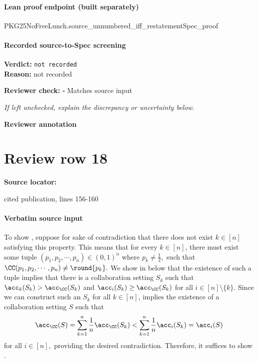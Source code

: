 \documentclass[10pt]{article}
\newcommand{\reviewerbox}{%
  \par\noindent\fbox{\parbox{0.96\linewidth}{\rule{0pt}{0.38in}}}\par
}
\newcommand{\reviewmatch}[1]{%
  \par\noindent\textbf{Reviewer check:} $\square$\; #1\par
  \noindent\emph{If left unchecked, explain the discrepancy or uncertainty below.}\par
}
\begin{document}
\paragraph{Lean proof endpoint (built separately)}\begin{ReviewVerbatim}
PKG25NoFreeLunch.source_unnumbered_iff_restatementSpec_proof
\end{ReviewVerbatim}

\paragraph{Recorded source-to-Spec screening}
\textbf{Verdict:} \texttt{not recorded}
\\
\textbf{Reason:} not recorded
\reviewmatch{Matches source input}
\noindent\textbf{Reviewer annotation}\par
\reviewerbox
\clearpage
\hypertarget{source-claim-f706fa3b58e00679}{}
\section*{Review row 18}
\textbf{Source locator:} {\footnotesize\raggedright cited publication, lines 156-\allowbreak{}160\par}
\paragraph{Verbatim source input}
\begin{ReviewVerbatim}
To show , suppose for sake of contradiction that there does not exist $k\in [n]$ satisfying this property. This means that for every $k\in [n]$, there must exist some tuple $(p_1,p_2,\cdots,p_n)\in (0,1)^n$ where $p_k\neq \frac{1}{2},$ such that $\CC(p_1,p_2,\cdots,p_n)\neq \round{p_k}.$ We show in   below that the existence of such a tuple implies that there is a collaboration setting $S_k$ such that $\acc_k(S_k)>\acc_\CC(S_k)$ and $\acc_i(S_k)\ge \acc_\CC(S_k)$ for all $i\in [n]\setminus \{k\}.$ Since we can construct such an $S_k$ for all $k\in [n]$,  implies the existence of a collaboration setting $S$ such that
\begin{equation}
     \acc_\CC(S) = \sum_{k=1}^n \frac{1}{n} \acc_\CC(S_k) < \sum_{k=1}^n \frac{1}{n} \acc_i(S_k) = \acc_i(S)
\end{equation}
for all $i\in [n],$ providing the desired contradiction. Therefore, it suffices to show .
\end{ReviewVerbatim}
\end{document}
